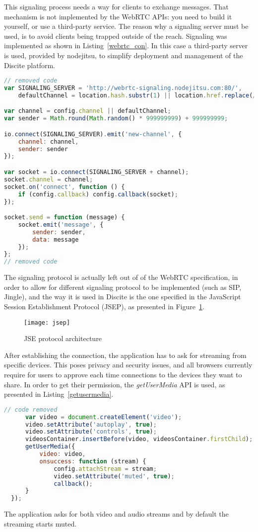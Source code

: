 This signaling process needs a way for clients to exchange messages.
That mechanism is not implemented by the WebRTC APIs: you need to build it
yourself, or use a third-party service. The reason why a signaling
server must be used, is to avoid clients being trapped outside of the reach.
Signaling was implemented as shown in Listing~\ref{webrtc_con}. In
this case a third-party server is used, provided by nodejitsu, to simplify
deployment and management of the Discite platform.
\begin{lstlisting}[language=JavaScript, caption={WebRTC connection setup}, label=webrtc_con]
// removed code
var SIGNALING_SERVER = 'http://webrtc-signaling.nodejitsu.com:80/',
    defaultChannel = location.hash.substr(1) || location.href.replace(/\/|:|#|%|\.|\[|\]/g, '');

var channel = config.channel || defaultChannel;
var sender = Math.round(Math.random() * 999999999) + 999999999;

io.connect(SIGNALING_SERVER).emit('new-channel', {
    channel: channel,
    sender: sender
});

var socket = io.connect(SIGNALING_SERVER + channel);
socket.channel = channel;
socket.on('connect', function () {
    if (config.callback) config.callback(socket);
});

socket.send = function (message) {
    socket.emit('message', {
        sender: sender,
        data: message
    });
};
// removed code
\end{lstlisting}

The signaling protocol is actually left out of of the WebRTC specification, in order
to allow for different signaling protocol to be implemented (such as SIP, Jingle),
and the way it is used in Discite is the one specified in the JavaScript Session Establishment Protocol
(JSEP), as presented in Figure~\ref{fig:jsep}.
\begin{figure}[ht!]
    \centering
    \texttt{[image: jsep]}
    \caption{JSE protocol architecture}
    \label{fig:jsep}
\end{figure}
After establishing the connection, the application has to ask for streaming from specific
devices. This poses privacy and security issues, and all browsers currently require for
users to approve each time connections to the devices they want to share.
In order to get their permission, the \textit{getUserMedia} API is used, as presented in Listing~\ref{getusermedia}.
\begin{lstlisting}[language=JavaScript, caption={getUserMedia request}, label=getusermedia]
// code removed
      var video = document.createElement('video');
      video.setAttribute('autoplay', true);
      video.setAttribute('controls', true);
      videosContainer.insertBefore(video, videosContainer.firstChild);
      getUserMedia({
          video: video,
          onsuccess: function (stream) {
              config.attachStream = stream;
              video.setAttribute('muted', true);
              callback();
      }
  });
\end{lstlisting}
The application asks for both video and audio streams and by default the streaming starts muted.

